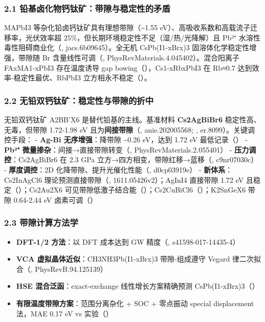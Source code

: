 \documentclass[12pt,a4paper]{ctexart}
\providecommand{\tightlist}{%
  \setlength{\itemsep}{0pt}\setlength{\parskip}{0pt}}
\begin{document}
\subsubsection{2.1 铅基卤化物钙钛矿：带隙与稳定性的矛盾}\label{ux94c5ux57faux5364ux5316ux7269ux9499ux949bux77ffux5e26ux9699ux4e0eux7a33ux5b9aux6027ux7684ux77dbux76fe}

MAPbI3 等杂化铅卤钙钛矿具有理想带隙（\textasciitilde1.55 eV）、高吸收系数和高载流子迁移率，光伏效率超 25\%，但长期环境稳定性不足（湿/热/光降解）且 Pb²⁺ 水溶性毒性阻碍商业化（\cite{p8}, jacs.6b09645）。全无机 CsPb(I1-xBrx)3 固溶体化学稳定性增强，带隙随 Br 含量线性可调（\cite{p4}, PhysRevMaterials.4.045402）。混合阳离子 FAxMA1-xPbI3 存在温度诱导 gap bowing（\cite{p49}），Cs1-xRbxPbI3 在 Rb≈0.7 达到效率-稳定性最优、RbPbI3 立方相永不稳定（\cite{p57}）。

\subsubsection{2.2 无铅双钙钛矿：稳定性与带隙的折中}\label{ux65e0ux94c5ux53ccux9499ux949bux77ffux7a33ux5b9aux6027ux4e0eux5e26ux9699ux7684ux6298ux4e2d}

无铅双钙钛矿 A2BB'X6 是替代铅基的主线。基准材料 \textbf{Cs2AgBiBr6} 稳定性高、无毒，但带隙 1.72-1.98 eV 且为\textbf{间接带隙}（\cite{p14}, anie.202005568; \cite{p17}, er.8099）。关键调控手段： - \textbf{Ag-Bi 无序增强}：降带隙 \textasciitilde0.26 eV，达到 1.72 eV 最低记录（\cite{p14}） - \textbf{Pb²⁺ 微量掺杂}：间接→直接带隙转变（\cite{p11}, PhysRevMaterials.2.055401） - \textbf{压力调控}：Cs2AgBiBr6 在 2.3 GPa 立方→四方相变，带隙红移→蓝移（\cite{p15}, c9nr07030c） - \textbf{厚度调控}：2D 化降带隙、提升光催化性能（\cite{p16}, d0cp03919e） - \textbf{新体系}：Cs2InAgCl6 理论预测直接带隙（\cite{p1}, 1611.05426v2）；AgInI4 直接带隙 1.72 eV 且稳定（\cite{p70}）；Cs2Au2X6 可见带隙低激子结合能（\cite{p67}）；Cs2CuBiCl6（\cite{p62}）；K2SnGeX6 带隙 0.64-2.44 eV 卤素可调（\cite{p66}）

\subsubsection{2.3 带隙计算方法学}\label{ux5e26ux9699ux8ba1ux7b97ux65b9ux6cd5ux5b66}

\begin{itemize}
\tightlist
\item
  \textbf{DFT-1/2 方法}：以 DFT 成本达到 GW 精度（\cite{p2}, s41598-017-14435-4）
\item
  \textbf{VCA 虚拟晶体近似}：CH3NH3Pb(I1-xBrx)3 带隙-组成遵守 Vegard 律二次拟合（\cite{p13}, PhysRevB.94.125139）
\item
  \textbf{HSE 混合泛函}：exact-exchange 线性增长方案精确预测 CsPb(I1-xBrx)3（\cite{p4}）
\item
  \textbf{有限温度带隙方案}：范围分离杂化 + SOC + 零点振动 special displacement 法，MAE 0.17 eV vs 实验（\cite{p46}）
\end{itemize}
\end{document}
